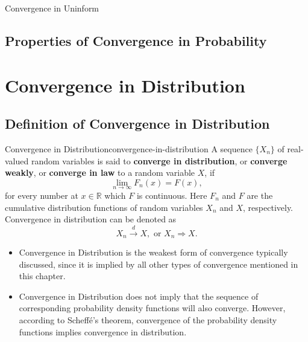 \begin{definition}{Convergence in Uninform}{}

\end{definition}

\subsection{Properties of Convergence in Probability}

\section{Convergence in Distribution}

\subsection{Definition of Convergence in Distribution}

\begin{definition}{Convergence in Distribution}{convergence-in-distribution}
    A sequence $\{X_n\}$ of real-valued random variables is said to \textbf{converge in distribution}, or \textbf{converge weakly}, or \textbf{converge in law} to a random variable $X$, if
    \begin{equation}
        \lim_{n\to\infty}F_n(x)=F(x),
    \end{equation}
    for every number at $x\in\mathbb{R}$ which $F$ is continuous. Here $F_n$ and $F$ are the cumulative distribution functions of random variables $X_n$ and $X$, respectively. Convergence in distribution can be denoted as
    \begin{equation}
        X_n \stackrel{d}{\rightarrow} X, \text{ or } X_n \Rightarrow X.
    \end{equation}
\end{definition}

\begin{note}
    \begin{itemize}
        \item Convergence in Distribution is the weakest form of convergence typically discussed, since it is implied by all other types of convergence mentioned in this chapter.
        \item Convergence in Distribution does not imply that the sequence of corresponding probability density functions will also converge. However, according to Scheff\'e's theorem, convergence of the probability density functions implies convergence in distribution.
    \end{itemize}
\end{note}

